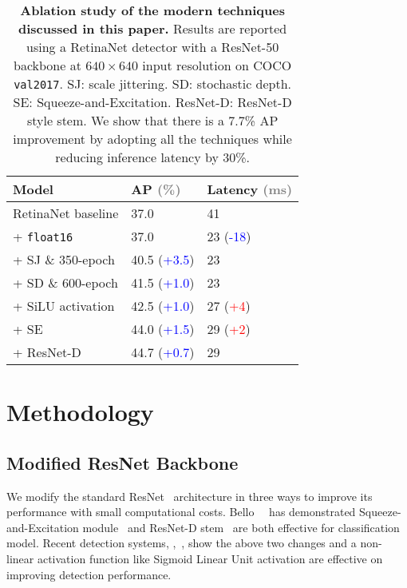 \documentclass[final]{cvpr}
\begin{document}

\setlength{\tabcolsep}{4pt}
\begin{table}[t]
\vspace{0mm}
\begin{center}{
\begin{tabular}{l | l |l}
\toprule
 Model & AP \textcolor{gray}{(\%)} &  Latency \textcolor{gray}{(ms)} \\
 \midrule
RetinaNet baseline &  37.0 & 41\\
+ \texttt{float16} &  37.0 & 23 (\textcolor{blue}{-18})\\
+ SJ \& 350-epoch &  40.5 (\textcolor{blue}{+3.5}) & 23 \\
+ SD \& 600-epoch & 41.5 (\textcolor{blue}{+1.0}) & 23 \\
+ SiLU activation & 42.5 (\textcolor{blue}{+1.0}) & 27 (\textcolor{red}{+4}) \\
+ SE & 44.0 (\textcolor{blue}{+1.5}) & 29 (\textcolor{red}{+2})\\
+ ResNet-D & 44.7 (\textcolor{blue}{+0.7}) & 29\\
\bottomrule
\end{tabular}
}
\end{center}
\caption{\textbf{Ablation study of the modern techniques discussed in this paper.} Results are reported using a RetinaNet detector with a ResNet-50 backbone at $640\times 640$ input resolution on COCO \texttt{val2017}. SJ: scale jittering. SD: stochastic depth. SE: Squeeze-and-Excitation. ResNet-D: ResNet-D style stem. We show that there is a 7.7\% AP improvement by adopting all the techniques while reducing inference latency by 30\%.}
\label{tab:resnet_modifications}
\vspace{-0mm}
\end{table}

\section{Methodology}\label{sec:methodology}
\subsection{Modified ResNet Backbone}\label{sec:resnet_modifications}
We modify the standard ResNet~\cite{resnet} architecture in three ways to improve its performance with small computational costs. Bello~\etal~\cite{bello2021revisiting} has demonstrated Squeeze-and-Excitation module~\cite{senet} and ResNet-D stem~\cite{inceptionv2,bagoftricks} are both effective for classification model. Recent detection systems, \eg,~\cite{efficientdet, bochkovskiy2020yolov4}, show the above two changes and a non-linear activation function like Sigmoid Linear Unit activation are effective on improving detection performance.
\end{document}
